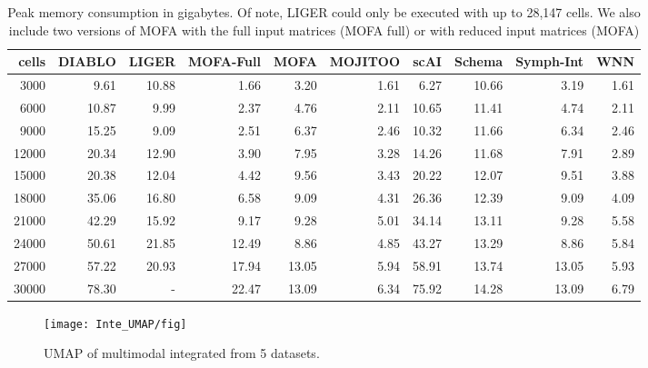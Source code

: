 \begin{table}[ht]
\centering
\caption[Peak Memory of MOJITOO]{Peak memory consumption in gigabytes. Of note, LIGER could only be executed with up to 28,147 cells. We also include  two versions of MOFA with the full input matrices (MOFA full) or with reduced input matrices (MOFA)}
\begin{tabular}{r|rrrrrrrrr}
  \hline
 cells & DIABLO & LIGER & MOFA-Full & MOFA & MOJITOO & scAI & Schema & Symph-Int & WNN \\ 
  \hline
3000 & 9.61 & 10.88 & 1.66 & 3.20 & 1.61 & 6.27 & 10.66 & 3.19 & 1.61 \\ 
  6000 & 10.87 & 9.99 & 2.37 & 4.76 & 2.11 & 10.65 & 11.41 & 4.74 & 2.11 \\ 
  9000 & 15.25 & 9.09 & 2.51 & 6.37 & 2.46 & 10.32 & 11.66 & 6.34 & 2.46 \\ 
  12000 & 20.34 & 12.90 & 3.90 & 7.95 & 3.28 & 14.26 & 11.68 & 7.91 & 2.89 \\ 
  15000 & 20.38 & 12.04 & 4.42 & 9.56 & 3.43 & 20.22 & 12.07 & 9.51 & 3.88 \\ 
  18000 & 35.06 & 16.80 & 6.58 & 9.09 & 4.31 & 26.36 & 12.39 & 9.09 & 4.09 \\ 
  21000 & 42.29 & 15.92 & 9.17 & 9.28 & 5.01 & 34.14 & 13.11 & 9.28 & 5.58 \\ 
  24000 & 50.61 & 21.85 & 12.49 & 8.86 & 4.85 & 43.27 & 13.29 & 8.86 & 5.84 \\ 
  27000 & 57.22 & 20.93 & 17.94 & 13.05 & 5.94 & 58.91 & 13.74 & 13.05 & 5.93 \\
  30000 & 78.30 & - & 22.47 & 13.09 & 6.34 & 75.92 & 14.28 & 13.09 & 6.79 \\ 
   \hline
\end{tabular}
\label{tab:memory}
\end{table}




\begin{figure}[!ht]
  \centering
  \texttt{[image: Inte\_UMAP/fig]}
  \vspace{0.1cm}
  \caption[UMAP of multimodal integrated from 5 datasets.]{UMAP of multimodal integrated from 5 datasets.}
  \label{fig:UMAP_Integrated5}
\end{figure}




